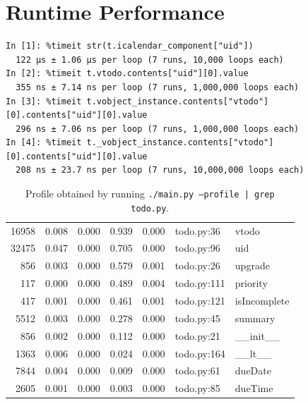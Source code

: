 \documentclass{prettytex/ox/mmsc-special-topic}
\begin{document}
  \section{Runtime Performance}
  \begin{verbatim}
In [1]: %timeit str(t.icalendar_component["uid"])
  122 µs ± 1.06 µs per loop (7 runs, 10,000 loops each)
In [2]: %timeit t.vtodo.contents["uid"][0].value
  355 ns ± 7.14 ns per loop (7 runs, 1,000,000 loops each)
In [3]: %timeit t.vobject_instance.contents["vtodo"][0].contents["uid"][0].value
  296 ns ± 7.06 ns per loop (7 runs, 1,000,000 loops each)
In [4]: %timeit t._vobject_instance.contents["vtodo"][0].contents["uid"][0].value
  208 ns ± 23.7 ns per loop (7 runs, 10,000,000 loops each)
  \end{verbatim}

  \begin{table}[H]
    \centering
    \caption{Profile obtained by running \texttt{./main.py --profile | grep todo.py}.}
    \begin{tabular}{rrrrrll}
      16958 & 0.008 & 0.000 & 0.939 & 0.000 & todo.py:36  & vtodo        \\
      32475 & 0.047 & 0.000 & 0.705 & 0.000 & todo.py:96  & uid          \\
      856   & 0.003 & 0.000 & 0.579 & 0.001 & todo.py:26  & upgrade      \\
      117   & 0.000 & 0.000 & 0.489 & 0.004 & todo.py:111 & priority     \\
      417   & 0.001 & 0.000 & 0.461 & 0.001 & todo.py:121 & isIncomplete \\
      5512  & 0.003 & 0.000 & 0.278 & 0.000 & todo.py:45  & summary      \\
      856   & 0.002 & 0.000 & 0.112 & 0.000 & todo.py:21  & \_\_init\_\_ \\
      1363  & 0.006 & 0.000 & 0.024 & 0.000 & todo.py:164 & \_\_lt\_\_   \\
      7844  & 0.004 & 0.000 & 0.009 & 0.000 & todo.py:61  & dueDate      \\
      2605  & 0.001 & 0.000 & 0.003 & 0.000 & todo.py:85  & dueTime      \\
    \end{tabular}
  \end{table}
\end{document}
